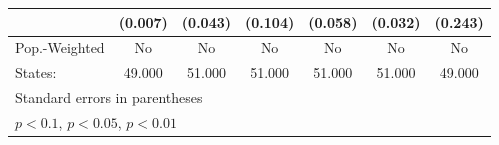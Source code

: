 {\begin{tabular}{l*{6}{c}}
            &     (0.007)         &     (0.043)         &     (0.104)         &     (0.058)         &     (0.032)         &     (0.243)         \\
\hline
Pop.-Weighted&          No         &          No         &          No         &          No         &          No         &          No         \\
States:     &      49.000         &      51.000         &      51.000         &      51.000         &      51.000         &      49.000         \\
\hline\hline
\multicolumn{7}{l}{\footnotesize Standard errors in parentheses}\\
\multicolumn{7}{l}{\footnotesize \sym{*} \(p<0.1\), \sym{**} \(p<0.05\), \sym{***} \(p<0.01\)}\\
\end{tabular}
}

